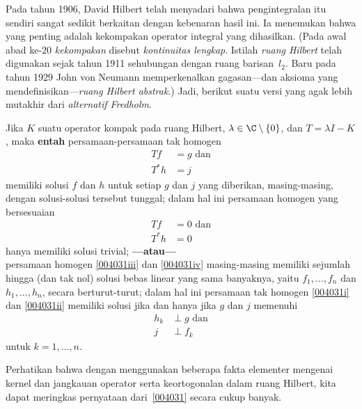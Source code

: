Pada tahun 1906, David Hilbert telah menyadari bahwa pengintegralan itu sendiri sangat sedikit berkaitan dengan
kebenaran hasil ini. Ia menemukan bahwa yang penting adalah kekompakan
operator integral yang dihasilkan. (Pada awal abad ke-$20$
\emph{kekompakan} disebut \emph{kontinuitas lengkap}. Istilah \emph{ruang Hilbert}
telah digunakan sejak tahun 1911 sehubungan dengan ruang barisan~$l_2$. Baru pada
tahun 1929 John von Neumann memperkenalkan gagasan---dan aksioma yang
mendefinisikan---\emph{ruang Hilbert abstrak}.) Jadi, berikut suatu versi yang agak lebih mutakhir dari
\emph{alternatif Fredholm}.

\begin{prop}\label{004031} Jika $K$ suatu operator kompak pada ruang
Hilbert, $\lambda \in \C\setminus\{0\}$, dan $T = \lambda I - K$, maka \textbf{entah} persamaan-persamaan
tak homogen
 \begin{align}
            Tf &= g\label{004031i} \text{ dan} \tag{1'}\\
            T^* h &= j\label{004031ii} \tag{2'}
 \end{align}
memiliki solusi $f$ dan $h$ untuk setiap $g$ dan $j$ yang diberikan, masing-masing, dengan solusi-solusi tersebut
tunggal; dalam hal ini persamaan homogen yang bersesuaian
 \begin{align}
            Tf &= 0\label{004031iii} \text{ dan} \tag{3'}\\
          T^*h &= 0\label{004031iv} \tag{4'}
 \end{align}
hanya memiliki solusi trivial; \textbf{---atau---}\\
persamaan homogen \eqref{004031iii} dan \eqref{004031iv} masing-masing memiliki
sejumlah hingga (dan tak nol) solusi bebas linear yang sama banyaknya, yaitu $f_1,\dots,f_n$ dan $h_1,\dots,h_n$,
secara berturut-turut; dalam hal ini persamaan tak homogen \eqref{004031i} dan
\eqref{004031ii} memiliki solusi jika dan hanya jika $g$ dan $j$ memenuhi
 \begin{align} h_k &\perp g\label{004031v} \text{ dan} \tag{5'}\\
                 j &\perp f_k\label{004031vi} \tag{6'}
 \end{align}
untuk $k = 1, \dots, n$.
\end{prop}

Perhatikan bahwa dengan menggunakan beberapa fakta elementer mengenai kernel dan jangkauan
operator serta keortogonalan dalam ruang Hilbert, kita dapat meringkas pernyataan
dari~\ref{004031} secara cukup banyak.

